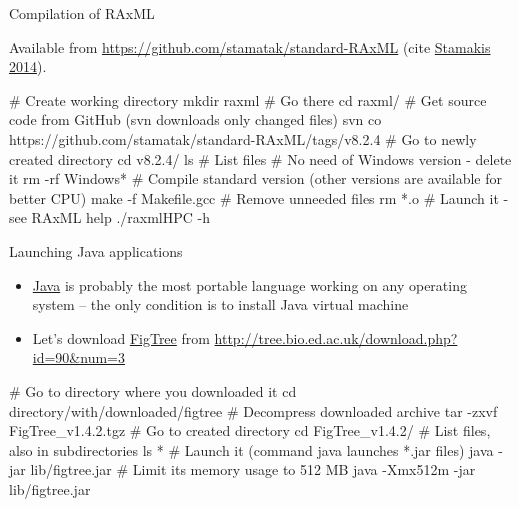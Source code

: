 \documentclass[compress, ucs, xelatex, 11pt, xcolor=svgnames,
  hyperref={
    bookmarks=true,
    unicode=true,
    colorlinks=true,
    pdftitle={Linux, command line and MetaCentrum},
    plainpages=false,
    pdfauthor={Vojtech Zeisek},
    pdfsubject={Course about use of Linux command line, writing shell scripts and using MetaCentrum of CESNET},
    pdfcreator={XeLaTeX},
    pdfkeywords={Linux, GNU, BASH, shell, command line, MetaCentrum},
    linkcolor=Red,
    anchorcolor=Blue,
    citecolor=Purple,
    filecolor=DodgerBlue,
    menucolor=DarkOrchid,
    urlcolor=DeepSkyBlue,
    pdftex},
  url={hyphens, lowtilde} %
  ]{beamer}
\begin{document}
\begin{frame}[fragile]{Compilation of RAxML}
\begin{footnotesize}
  Available from \url{https://github.com/stamatak/standard-RAxML} (cite \href{https://bioinformatics.oxfordjournals.org/content/30/9/1312.abstract}{Stamakis 2014}).
\end{footnotesize}
  \begin{bashcode}
    # Create working directory
    mkdir raxml
    # Go there
    cd raxml/
    # Get source code from GitHub (svn downloads only changed files)
    svn co https://github.com/stamatak/standard-RAxML/tags/v8.2.4
    # Go to newly created directory
    cd v8.2.4/
    ls # List files
    # No need of Windows version - delete it
    rm -rf Windows*
    # Compile standard version (other versions are available for better CPU)
    make -f Makefile.gcc
    # Remove unneeded files
    rm *.o
    # Launch it - see RAxML help
    ./raxmlHPC -h
  \end{bashcode}
\end{frame}

\begin{frame}[fragile]{Launching Java applications}
\begin{itemize}
  \item \href{https://www.java.com/}{Java} is probably the most portable language working on any operating system -- the only condition is to install Java virtual machine
  \item Let's download \href{http://tree.bio.ed.ac.uk/software/figtree/}{FigTree} from \url{http://tree.bio.ed.ac.uk/download.php?id=90&num=3}
\end{itemize}
  \begin{bashcode}
    # Go to directory where you downloaded it
    cd directory/with/downloaded/figtree
    # Decompress downloaded archive
    tar -zxvf FigTree_v1.4.2.tgz
    # Go to created directory
    cd FigTree_v1.4.2/
    # List files, also in subdirectories
    ls *
    # Launch it (command java launches *.jar files)
    java -jar lib/figtree.jar
    # Limit its memory usage to 512 MB
    java -Xmx512m -jar lib/figtree.jar
  \end{bashcode}
\end{frame}

\end{document}
